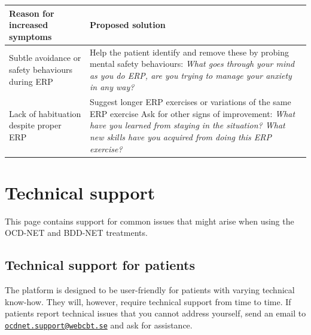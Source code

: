 \documentclass[]{book}
\theoremstyle{definition}
\theoremstyle{definition}
\theoremstyle{definition}
\theoremstyle{remark}
\begin{document}
\begin{longtable}[]{@{}ll@{}}
\toprule
\begin{minipage}[b]{0.47\columnwidth}\raggedright
Reason for increased symptoms\strut
\end{minipage} & \begin{minipage}[b]{0.47\columnwidth}\raggedright
Proposed solution\strut
\end{minipage}\tabularnewline
\midrule
\endhead
\begin{minipage}[t]{0.47\columnwidth}\raggedright
Subtle avoidance or safety behaviours during ERP\strut
\end{minipage} & \begin{minipage}[t]{0.47\columnwidth}\raggedright
Help the patient identify and remove these by probing mental safety
behaviours: \emph{What goes through your mind as you do ERP, are you
trying to manage your anxiety in any way?}\strut
\end{minipage}\tabularnewline
\begin{minipage}[t]{0.47\columnwidth}\raggedright
Lack of habituation despite proper ERP\strut
\end{minipage} & \begin{minipage}[t]{0.47\columnwidth}\raggedright
Suggest longer ERP exercises or variations of the same ERP exercise Ask
for other signs of improvement: \emph{What have you learned from staying
in the situation? What new skills have you acquired from doing this ERP
exercise?}\strut
\end{minipage}\tabularnewline
\bottomrule
\end{longtable}

\hypertarget{technical-support}{%
\chapter{Technical support}\label{technical-support}}

This page contains support for common issues that might arise when using
the OCD-NET and BDD-NET treatments.

\hypertarget{technical-support-for-patients}{%
\section{Technical support for
patients}\label{technical-support-for-patients}}

The platform is designed to be user-friendly for patients with varying
technical know-how. They will, however, require technical support from
time to time. If patients report technical issues that you cannot
address yourself, send an email to
\href{mailto:ocdnet.support@webcbt.se}{\nolinkurl{ocdnet.support@webcbt.se}}
and ask for assistance.
\end{document}

